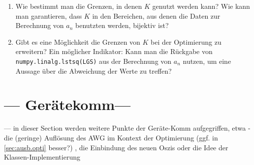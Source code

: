 \documentclass[../Report.tex]{subfiles}
\begin{document}
\begin{enumerate}
	\item	Wie bestimmt man die Grenzen, in denen $K$ genutzt werden kann? Wie kann man garantieren, dass $K$ in den Bereichen, aus denen die Daten zur Berechnung von $a_n$ benutzten werden, bijektiv ist?
	
	\item	Gibt es eine Möglichkeit die Grenzen von $K$ bei der Optimierung zu erweitern? Ein möglicher Indikator: Kann man die Rückgabe von \lstinline{numpy.linalg.lstsq(LGS)} aus der Berechnung von $a_n$ nutzen, um eine Aussage über die Abweichung der Werte zu treffen?
\end{enumerate}





\section{--- Gerätekomm---}
\label{sec:ausb.geraete}
--- in dieser Section werden weitere Punkte der Geräte-Komm aufgegriffen, etwa - die (geringe) Auflösung des AWG im Kontext der Optimierung (ggf. in \ref{sec:ausb.opti} besser?) , die Einbindung des neuen Oszis oder die Idee der Klassen-Implementierung 

\end{document}
